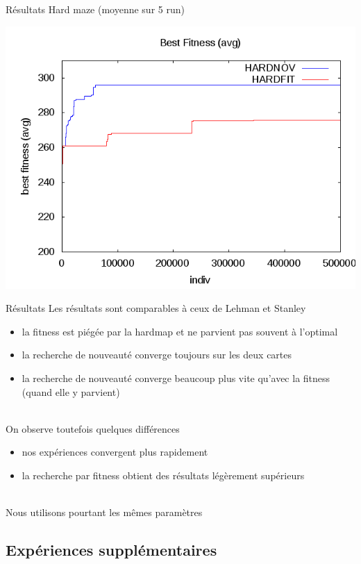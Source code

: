 \documentclass{beamer}
\begin{document}
\begin{frame}{Résultats}
Hard maze (moyenne sur 5 run)
\begin{center}
    \includegraphics[width=.95\linewidth]{images/hard_bestfitness_means_1}
\end{center}
\end{frame}


\begin{frame}{Résultats}
Les résultats sont comparables à ceux de Lehman et Stanley
\begin{itemize}
    \item la fitness est piégée par la hardmap et ne parvient pas souvent à l'optimal
    \item la recherche de nouveauté converge toujours sur les deux cartes
    \item la recherche de nouveauté converge beaucoup plus vite qu'avec la fitness (quand elle y parvient)
\end{itemize}
~\\
On observe toutefois quelques différences
\begin{itemize}
    \item nos expériences convergent plus rapidement
    \item la recherche par fitness obtient des résultats légèrement supérieurs
\end{itemize}
~\\
Nous utilisons pourtant les mêmes paramètres
\end{frame}


\subsection{Expériences supplémentaires}
\end{document}

